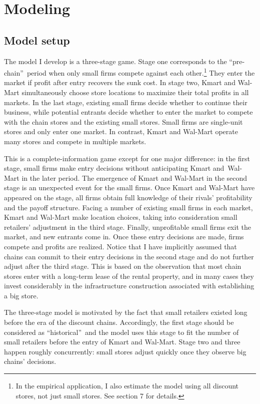 \documentclass[notitlepage,onecolumn,11pt]{article}
\begin{document}
\section{Modeling}

\subsection{Model setup\label{Model}}

The model I develop is a three-stage game. Stage one corresponds to the
\textquotedblleft pre-chain\textquotedblright\ period when only small firms
compete against each other.\footnote{%
In the empirical application, I also estimate the model using all discount
stores, not just small stores. See section 7 for details.} They enter the
market if profit after entry recovers the sunk cost. In stage two, Kmart and
Wal-Mart simultaneously choose store locations to maximize their total
profits in all markets. In the last stage, existing small firms decide
whether to continue their business, while potential entrants decide whether
to enter the market to compete with the chain stores and the existing small
stores. Small firms are single-unit stores and only enter one market. In
contrast, Kmart and Wal-Mart operate many stores and compete in multiple
markets.

This is a complete-information game except for one major difference: in the
first stage, small firms make entry decisions without anticipating Kmart
and\ Wal-Mart in the later period. The emergence of Kmart and Wal-Mart in
the second stage is an unexpected event for the small firms. Once Kmart and
Wal-Mart have appeared on the stage, all firms obtain full knowledge of
their rivals' profitability and the payoff structure. Facing a number of
existing small firms in each market, Kmart and Wal-Mart make location
choices, taking into consideration small retailers' adjustment in the third
stage. Finally, unprofitable small firms exit the market, and new entrants
come in. Once these entry decisions are made, firms compete and profits are
realized. Notice that I have implicitly assumed that chains can commit to
their entry decisions in the second stage and do not further adjust after
the third stage. This is based on the observation that most chain stores
enter with a long-term lease of the rental property, and in many cases they
invest considerably in the infrastructure construction associated with
establishing a big store.

The three-stage model is motivated by the fact that small retailers existed
long before the era of the discount chains. Accordingly, the first stage
should be considered as \textquotedblleft historical\textquotedblright\ and
the model uses this stage to fit the number of small retailers before the
entry of Kmart and Wal-Mart. Stage two and three happen roughly
concurrently: small stores adjust quickly once they observe big chains'
decisions.
\end{document}
